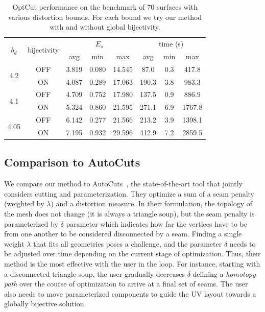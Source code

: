 \begin{table}[t]
\centering
\caption{OptCut performance on the benchmark of 70 surfaces with various distortion bounds. For each bound we try our method with and without global bijectivity.}
\label{tb:stats_OptCuts}
\begin{tabular}{|c|c|ccc|ccc|}
\hline
\multirow{2}{*}{$b_d$} & \multirow{2}{*}{bijectivity} & \multicolumn{3}{c|}{$E_{s}$} & \multicolumn{3}{c|}{time (s)} \\ \cline{3-8} 
                       &                         & avg      & min     & max      & avg       & min    & max      \\ \hline
\multirow{2}{*}{4.2}   & OFF                    & 3.819   & 0.080  & 14.545  & 87.0   & 0.3 & 417.8 \\
                       & ON                & 4.087   & 0.289  & 17.063  & 190.3   & 3.8 & 983.3  \\ \hline
\multirow{2}{*}{4.1}   & OFF                    & 4.709   & 0.752  & 17.980  & 137.5  & 0.9 & 886.9 \\
                       & ON                & 5.324   & 0.860  & 21.595  & 271.1   & 6.9 & 1767.8  \\ \hline
\multirow{2}{*}{4.05}  & OFF                    & 6.142   & 0.277  & 21.566  & 213.2  & 3.9 & 1398.1   \\
                       & ON                & 7.195   & 0.932  & 29.596  & 412.9   & 7.2 & 2859.5 \\ \hline
\end{tabular}
\end{table}

\subsection{Comparison to AutoCuts}
We compare our method to AutoCuts~\cite{Poranne2017Autocuts}, the state-of-the-art tool that jointly considers cutting and parameterization. 
They optimize a sum of a seam penalty (weighted by $\lambda$) and a distortion measure. In their formulation, the topology of the mesh does not change
(it is always a triangle soup), but the seam penalty is parameterized by $\delta$ parameter which indicates how far the vertices have to be from one another
to be considered disconnected by a seam. Finding a single weight $\lambda$ that fits all geometries poses a challenge, and the parameter
$\delta$ needs to be adjusted over time depending on the current stage of optimization. Thus, their method is the most effective with the user in the loop. For instance, starting with a disconnected triangle soup, the user gradually decreases $\delta$ defining a {\em homotopy path} over the course of optimization to arrive at a final set of seams. The user also needs to move parameterized components to guide the UV layout towards a globally bijective solution. 
%

